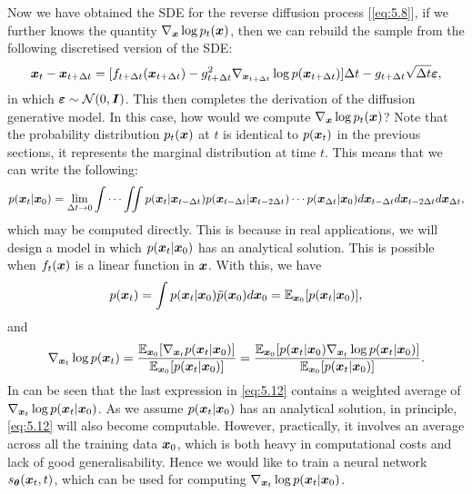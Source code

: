 Now we have obtained the SDE for the reverse diffusion process [\cref{eq:5.8}], if we further knows the quantity $\nabla_{\bm{x}}\log p_t(\bm{x})$, then we can rebuild the sample from the following discretised version of the SDE:
\begin{equation}
    \label{eq:5.9}
    \bm{x}_{t}-\bm{x}_{t+\Delta t}=[f_{t+\Delta t}(\bm{x}_{t+\Delta t})-g_{t+\Delta t}^2 \nabla_{\bm{x}_{t+\Delta t}} \log p(\bm{x}_{t+\Delta t})]\Delta t - g_{t+\Delta t}\sqrt{\Delta t}\bm{\varepsilon},
\end{equation}
in which $\bm{\varepsilon}\sim\mathcal{N}(0,\bm{I})$. This then completes the derivation of the diffusion generative model. In this case, how would we compute $\nabla_{\bm{x}}\log p_t(\bm{x})$? Note that the probability distribution $p_t(\bm{x})$ at $t$ is identical to $p(\bm{x}_{t})$ in the previous sections, it represents the marginal distribution at  time $t$. This means that we can write the following:
\begin{equation}
    \label{eq:5.10}
    p(\bm{x}_{t}|\bm{x}_0)=\lim_{\Delta t \to 0}\int\cdots\iint p(\bm{x}_{t}|\bm{x}_{t-\Delta t})p(\bm{x}_{t-\Delta t}|\bm{x}_{t-2\Delta t})\cdots p(\bm{x}_{\Delta t}|\bm{x}_0)d\bm{x}_{t-\Delta t}d\bm{x}_{t-2\Delta t}d\bm{x}_{\Delta t},
\end{equation}
which may be computed directly. This is because in real applications, we will design a model in which $p(\bm{x}_{t}|\bm{x}_0)$ has an analytical solution. This is possible when $f_t(\bm{x})$ is a linear function in $\bm{x}$. With this, we have
\begin{equation}
    \label{eq:5.11}
    p(\bm{x}_{t})=\int p(\bm{x}_{t}|\bm{x}_0)\tilde{p}(\bm{x}_0)d\bm{x}_0=\mathbb{E}_{\bm{x}_0}[p(\bm{x}_{t}|\bm{x}_0)], 
\end{equation}
and
\begin{equation}
    \label{eq:5.12}
    \nabla_{\bm{x}_t}\log p(\bm{x}_t)=\frac{\mathbb{E}_{\bm{x}_0}[\nabla_{\bm{x}_t}p(\bm{x}_{t}|\bm{x}_0)]}{\mathbb{E}_{\bm{x}_0}[p(\bm{x}_{t}|\bm{x}_0)]}=\frac{\mathbb{E}_{\bm{x}_0}[p(\bm{x}_{t}|\bm{x}_0)\nabla_{\bm{x}_t}\log p(\bm{x}_{t}|\bm{x}_0)]}{\mathbb{E}_{\bm{x}_0}[p(\bm{x}_{t}|\bm{x}_0)]}.
\end{equation}
In can be seen that  the last expression in \cref{eq:5.12} contains a weighted average of $\nabla_{\bm{x}_t}\log p(\bm{x}_{t}|\bm{x}_0)$. As we assume $p(\bm{x}_{t}|\bm{x}_0)$ has an analytical solution, in principle,  \cref{eq:5.12} will also become computable. However, practically, it involves an average across all the training data $\bm{x}_0$, which is both heavy in computational costs and lack of good generalisability. Hence we would like to train a neural network $s_{\bm{\theta}}(\bm{x}_{t},t)$, which can be used for computing $\nabla_{\bm{x}_t}\log p(\bm{x}_{t}|\bm{x}_0)$.

